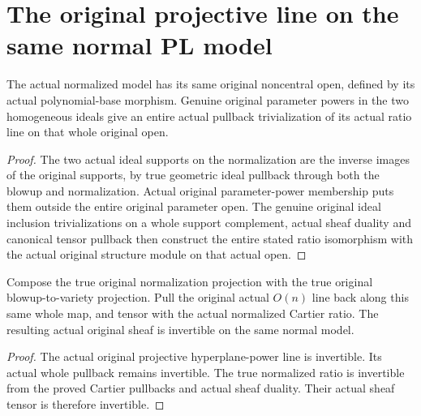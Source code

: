 \section{The original projective line on the same normal PL model}

\begin{definition}
\label{def:actual-normalized-pl-ratio-noncentral-trivialization}
\leanok
{}
The actual normalized model has its same original noncentral open, defined
by its actual polynomial-base morphism. Genuine original parameter powers
in the two homogeneous ideals give an entire actual pullback trivialization
of its actual ratio line on that whole original open.
\end{definition}
\begin{proof}
The two actual ideal supports on the normalization are the inverse images
of the original supports, by true geometric ideal pullback through both the
blowup and normalization. Actual original parameter-power membership puts
them outside the entire original parameter open. The genuine original ideal
inclusion trivializations on a whole support complement, actual sheaf duality
and canonical tensor pullback then construct the entire stated ratio isomorphism
with the actual original structure module on that actual open.
\end{proof}

\begin{definition}
\label{def:actual-normalized-pl-projective-twist-line}
\leanok
{}
Compose the true original normalization projection with the true original
blowup-to-variety projection. Pull the original actual $O(n)$ line back along
this same whole map, and tensor with the actual normalized Cartier ratio.
The resulting actual original sheaf is invertible on the same normal model.
\end{definition}
\begin{proof}
The actual original projective hyperplane-power line is invertible. Its
actual whole pullback remains invertible. The true normalized ratio is
invertible from the proved Cartier pullbacks and actual sheaf duality.
Their actual sheaf tensor is therefore invertible.
\end{proof}

